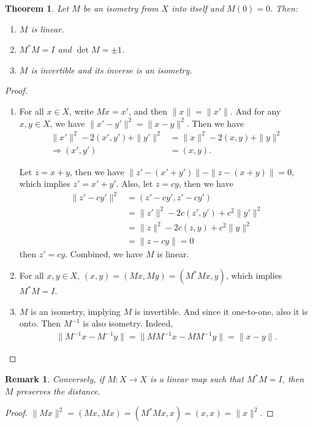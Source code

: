 \documentclass[11pt]{book}
\newtheorem{theorem}{Theorem}[section]
\newtheorem{remark}{Remark}[section]
\theoremstyle{definition}
\numberwithin{equation}{subsection}
\begin{document}
\begin{theorem}
Let $M$ be an isometry from $X$ into itself and $M(0) = 0$. Then:
\begin{enumerate}[label=(\roman*)]
    \item $M$ is linear.
    \item $M^* M = I$ and $\det M = \pm 1$.
    \item $M$ is invertible and its inverse is an isometry.
\end{enumerate}
\end{theorem}
\begin{proof}
~\begin{enumerate}[label=(\roman*)]
    \item For all $x\in X$, write $Mx = x'$, and then $\|x\| = \|x'\|$. And for any $x,y\in X$, we have $\|x' - y'\|^2 = \|x - y\|^2$. Then we have
    \begin{align*}
        \|x'\|^2 - 2(x', y') + \|y'\|^2 & = \|x\|^2 - 2(x, y) + \|y\|^2 \\
        \Rightarrow (x', y') & = (x, y).
    \end{align*}
    
    Let $z = x + y$, then we have $\|z'-(x'+y')\| - \|z-(x+y)\| = 0$, which implies $z' = x' + y'$. Also, let $z = cy$, then we have
    \begin{align*}
        \|z' - cy'\|^2 & = (z' - cy', z' - cy') \\
        & = \|z'\|^2 - 2c (z', y') + c^2 \|y'\|^2 \\
        & = \|z\|^2 - 2c (z, y) + c^2 \|y\|^2 \\
        & = \|z - cy\| = 0
    \end{align*}
    then $z' = cy$. Combined, we have $M$ is linear.
    \item For all $x,y\in X$, $(x,y) = (Mx, My) = (M^* M x, y)$, which implies $M^* M = I$.
    \item $M$ is an isometry, implying $M$ is invertible. And since it one-to-one, also it is onto. Then $M^{-1}$ is also isometry. Indeed, 
    \begin{align*}
        \|M^{-1}x - M^{-1}y\| = \|M M^{-1}x - M M^{-1}y\| = \|x - y\|.
    \end{align*}
\end{enumerate}
\end{proof}

\begin{remark}
Conversely, if $M:X\to X$ is a linear map such that $M^* M = I$, then $M$ preserves the distance.
\end{remark}
\begin{proof}
$\|Mx\|^2 = (Mx, Mx) = (M^* M x, x) = (x, x) = \|x\|^2$.
\end{proof}
\end{document}
